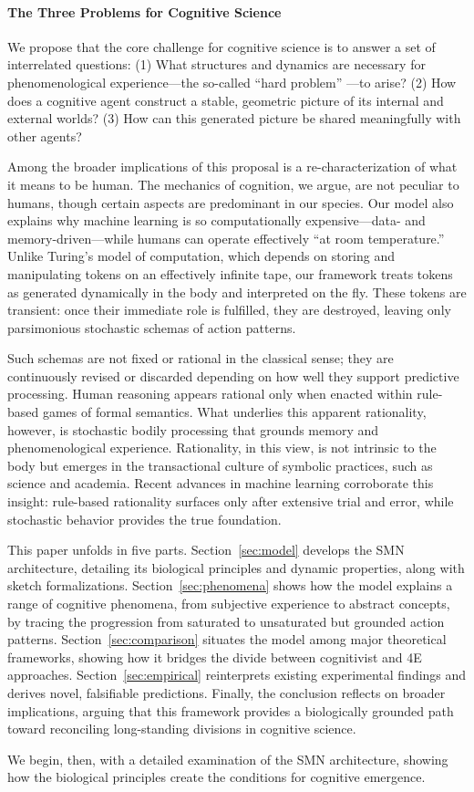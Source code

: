 \paragraph{The Three Problems for Cognitive Science}
We propose that the core challenge for cognitive science is to answer a set of interrelated questions: (1) What structures and dynamics are necessary for phenomenological experience---the so-called ``hard problem'' \cite{chalmers1995facing}---to arise? (2) How does a cognitive agent construct a stable, geometric picture of its internal and external worlds? (3) How can this generated picture be shared meaningfully with other agents?  

Among the broader implications of this proposal is a re-characterization of what it means to be human. The mechanics of cognition, we argue, are not peculiar to humans, though certain aspects are predominant in our species. Our model also explains why machine learning is so computationally expensive—data- and memory-driven—while humans can operate effectively “at room temperature.” Unlike Turing’s model of computation, which depends on storing and manipulating tokens on an effectively infinite tape, our framework treats tokens as generated dynamically in the body and interpreted on the fly. These tokens are transient: once their immediate role is fulfilled, they are destroyed, leaving only parsimonious stochastic schemas of action patterns. 

Such schemas are not fixed or rational in the classical sense; they are continuously revised or discarded depending on how well they support predictive processing. Human reasoning appears rational only when enacted within rule-based games of formal semantics. What underlies this apparent rationality, however, is stochastic bodily processing that grounds memory and phenomenological experience. Rationality, in this view, is not intrinsic to the body but emerges in the transactional culture of symbolic practices, such as science and academia. Recent advances in machine learning corroborate this insight: rule-based rationality surfaces only after extensive trial and error, while stochastic behavior provides the true foundation.

This paper unfolds in five parts. Section~\ref{sec:model} develops the SMN architecture, detailing its biological principles and dynamic properties, along with sketch formalizations. Section~\ref{sec:phenomena} shows how the model explains a range of cognitive phenomena, from subjective experience to abstract concepts, by tracing the progression from saturated to unsaturated but grounded action patterns. Section~\ref{sec:comparison} situates the model among major theoretical frameworks, showing how it bridges the divide between cognitivist and 4E approaches. Section~\ref{sec:empirical} reinterprets existing experimental findings and derives novel, falsifiable predictions. Finally, the conclusion reflects on broader implications, arguing that this framework provides a biologically grounded path toward reconciling long-standing divisions in cognitive science.

We begin, then, with a detailed examination of the SMN architecture, showing how the biological principles create the conditions for cognitive emergence.






